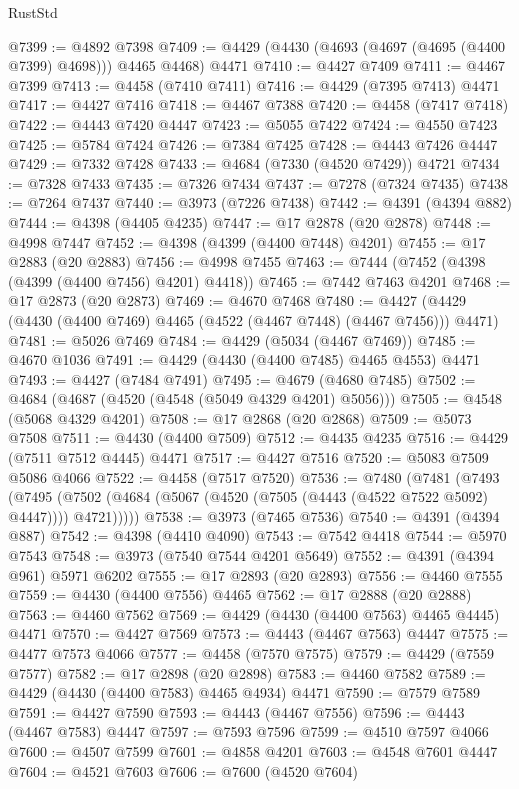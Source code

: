 \begin{lexlean}{RustStd}
\begin{coremodule}
@7399 := @4892 @7398
@7409 := @4429 (@4430 (@4693 (@4697 (@4695 (@4400 @7399) @4698))) @4465 @4468) @4471
@7410 := @4427 @7409
@7411 := @4467 @7399
@7413 := @4458 (@7410 @7411)
@7416 := @4429 (@7395 @7413) @4471
@7417 := @4427 @7416
@7418 := @4467 @7388
@7420 := @4458 (@7417 @7418)
@7422 := @4443 @7420 @4447
@7423 := @5055 @7422
@7424 := @4550 @7423
@7425 := @5784 @7424
@7426 := @7384 @7425
@7428 := @4443 @7426 @4447
@7429 := @7332 @7428
@7433 := @4684 (@7330 (@4520 @7429)) @4721
@7434 := @7328 @7433
@7435 := @7326 @7434
@7437 := @7278 (@7324 @7435)
@7438 := @7264 @7437
@7440 := @3973 (@7226 @7438)
@7442 := @4391 (@4394 @882)
@7444 := @4398 (@4405 @4235)
@7447 := @17 @2878 (@20 @2878)
@7448 := @4998 @7447
@7452 := @4398 (@4399 (@4400 @7448) @4201)
@7455 := @17 @2883 (@20 @2883)
@7456 := @4998 @7455
@7463 := @7444 (@7452 (@4398 (@4399 (@4400 @7456) @4201) @4418))
@7465 := @7442 @7463 @4201
@7468 := @17 @2873 (@20 @2873)
@7469 := @4670 @7468
@7480 := @4427 (@4429 (@4430 (@4400 @7469) @4465 (@4522 (@4467 @7448) (@4467 @7456))) @4471)
@7481 := @5026 @7469
@7484 := @4429 (@5034 (@4467 @7469))
@7485 := @4670 @1036
@7491 := @4429 (@4430 (@4400 @7485) @4465 @4553) @4471
@7493 := @4427 (@7484 @7491)
@7495 := @4679 (@4680 @7485)
@7502 := @4684 (@4687 (@4520 (@4548 (@5049 @4329 @4201) @5056)))
@7505 := @4548 (@5068 @4329 @4201)
@7508 := @17 @2868 (@20 @2868)
@7509 := @5073 @7508
@7511 := @4430 (@4400 @7509)
@7512 := @4435 @4235
@7516 := @4429 (@7511 @7512 @4445) @4471
@7517 := @4427 @7516
@7520 := @5083 @7509 @5086 @4066
@7522 := @4458 (@7517 @7520)
@7536 := @7480
    (@7481
      (@7493
        (@7495 (@7502 (@4684 (@5067 (@4520 (@7505 (@4443 (@4522 @7522 @5092) @4447)))) @4721)))))
@7538 := @3973 (@7465 @7536)
@7540 := @4391 (@4394 @887)
@7542 := @4398 (@4410 @4090)
@7543 := @7542 @4418
@7544 := @5970 @7543
@7548 := @3973 (@7540 @7544 @4201 @5649)
@7552 := @4391 (@4394 @961) @5971 @6202
@7555 := @17 @2893 (@20 @2893)
@7556 := @4460 @7555
@7559 := @4430 (@4400 @7556) @4465
@7562 := @17 @2888 (@20 @2888)
@7563 := @4460 @7562
@7569 := @4429 (@4430 (@4400 @7563) @4465 @4445) @4471
@7570 := @4427 @7569
@7573 := @4443 (@4467 @7563) @4447
@7575 := @4477 @7573 @4066
@7577 := @4458 (@7570 @7575)
@7579 := @4429 (@7559 @7577)
@7582 := @17 @2898 (@20 @2898)
@7583 := @4460 @7582
@7589 := @4429 (@4430 (@4400 @7583) @4465 @4934) @4471
@7590 := @7579 @7589
@7591 := @4427 @7590
@7593 := @4443 (@4467 @7556)
@7596 := @4443 (@4467 @7583) @4447
@7597 := @7593 @7596
@7599 := @4510 @7597 @4066
@7600 := @4507 @7599
@7601 := @4858 @4201
@7603 := @4548 @7601 @4447
@7604 := @4521 @7603
@7606 := @7600 (@4520 @7604)

\end{coremodule}
\end{lexlean}
